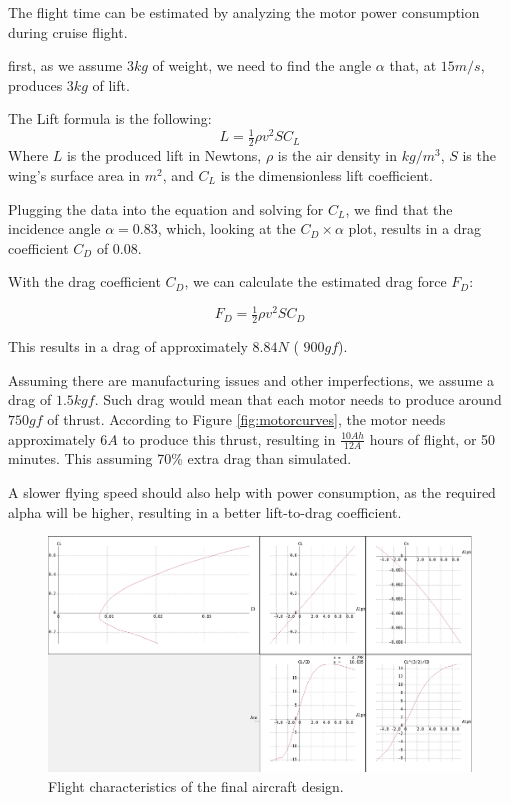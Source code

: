 The flight time can be estimated by analyzing the motor power consumption during cruise flight.

first, as we assume $ 3 kg $ of weight, we need to find the angle $\alpha$ that, at $15 m/s$, produces $3kg$ of lift.

The Lift formula is the following:
\begin{equation}
L=\tfrac{1}{2}\rho v^{2}SC_{L}
\end{equation}
Where $L$ is the produced lift in Newtons, $\rho$ is the air density in $kg/m^3$, $S$ is the wing's surface area in $m^2$, and $C_L$ is the dimensionless lift coefficient.

Plugging the data into the equation and solving for $C_L$, we find that the incidence angle $\alpha = 0.83$, which, looking at the $C_D \times \alpha$ plot, results in a drag coefficient $C_D$ of 0.08.

With the drag coefficient $C_D$, we can calculate the estimated drag force $F_D$:

\begin{equation}
F_{D}=\tfrac{1}{2}\rho v^{2} S C_{D}
\end{equation}

This results in a drag of approximately $8.84N$ ( $900 gf$).

Assuming there are manufacturing issues and other imperfections, we assume a drag of $1.5 kgf$. Such drag would mean that each motor needs to produce around $ 750 gf$ of thrust. According to Figure \ref{fig:motorcurves}, the motor needs 
approximately $6 A$ to produce this thrust, resulting in $\frac{10Ah}{12A}$ hours of flight, or 50 minutes. This assuming 70\% extra drag than simulated.

A slower flying speed should also help with power consumption, as the required alpha will be higher, resulting in a better lift-to-drag coefficient.



\begin{figure}
\centering
  \includegraphics[width=\linewidth]{figs/craftpolar2.png}
  \caption{Flight characteristics of the final aircraft design.}
  \label{fig:craftpolar}
\end{figure}


